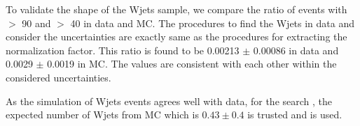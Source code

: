 To validate the shape of the Wjets sample, we compare the ratio of events with \mttwo $>$ 90 \GeV and  \mttwo $>$ 40 \GeV in data and MC.
The procedures to find the Wjets in data and consider the uncertainties are exactly same as the procedures for extracting the normalization  
factor. This ratio is found to be 0.00213 $\pm$ 0.00086 in data and  0.0029 $\pm$ 0.0019 in MC. The values are consistent with each other within 
the considered uncertainties.

As the simulation of Wjets events agrees well with data, for the search \bintwo, the expected number of Wjets from MC which is $0.43\pm0.4$ is trusted and is used.


